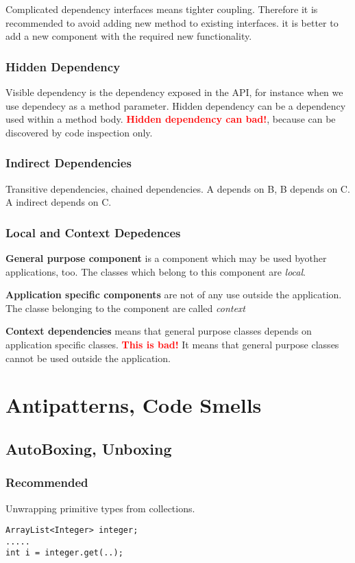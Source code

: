 \documentclass{report}
\begin{document}
Complicated dependency interfaces means tighter coupling. Therefore it is recommended to avoid adding new method to existing interfaces.
it is better to add a new component with the required new functionality.

\section{Hidden Dependency}
Visible dependency is the dependency exposed in the API, for instance when we use dependecy as a method parameter. Hidden dependency can be
a dependency used within a method body. \textbf{\textcolor{red}{Hidden dependency can bad!}}, because can be discovered by code inspection only.

\section{Indirect Dependencies}
Transitive dependencies, chained dependencies. A depends on B, B depends on C. A indirect depends on C.

\section{Local and Context Depedences}
\textbf{General purpose component} is a component which may be used byother applications, too. The classes which belong to this component are \textit{local}.

\textbf{Application specific components} are not of any use outside the application. The classe belonging to the component are called \textit{context}

\textbf{Context dependencies} means that general purpose classes depends on application specific classes. \textbf{\textcolor{red}{This is bad!}}
It means that general purpose classes cannot be used outside the application.




\part{Antipatterns, Code Smells}



\chapter{AutoBoxing, Unboxing}


\section*{Recommended}
Unwrapping primitive types from collections.
\begin{verbatim}
ArrayList<Integer> integer;
.....
int i = integer.get(..);

\end{verbatim}
\end{document}
